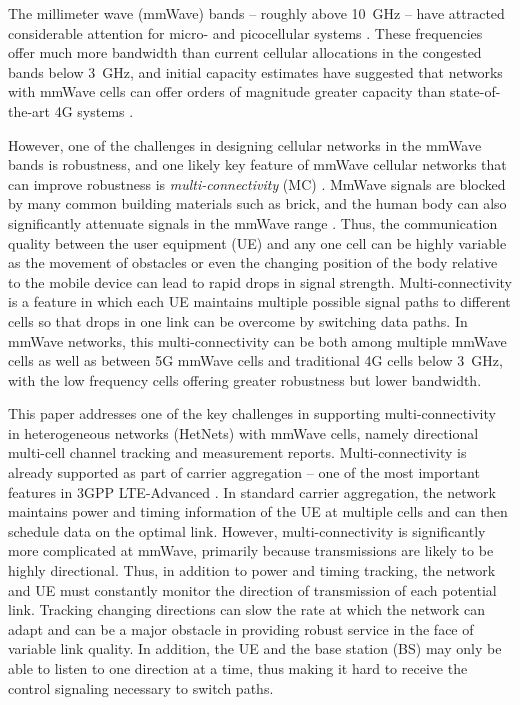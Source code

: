\documentclass[conference,a4paper]{IEEEtran}
\begin{document}
The millimeter wave (mmWave) bands -- roughly above 10~GHz --
have attracted considerable attention
for micro- and picocellular systems \cite{RanRapE:14}.
These frequencies offer much more
bandwidth than current cellular allocations in the congested bands below 3~GHz, and initial capacity estimates have suggested that networks with
mmWave cells can offer orders of magnitude greater capacity than state-of-the-art 4G systems \cite{Mustafa}.

However, one of the challenges in designing cellular networks in the mmWave bands is robustness,
and one likely key feature of mmWave cellular networks that can improve robustness is
\emph{ multi-connectivity} (MC) \cite{MC}.
MmWave signals are blocked by many common building materials such as brick, and  the human body can also
significantly attenuate signals in the mmWave range \cite{lu2012modeling}.  Thus, the communication quality
between the user equipment (UE)
and any one cell can be highly variable as the movement of obstacles or even the changing position of the
body relative to the mobile device can lead to rapid drops in signal strength.
Multi-connectivity is a feature in which each UE maintains multiple possible signal paths to different
cells so that drops in one link can be overcome by switching data paths.
In  mmWave networks, this multi-connectivity can be  both among multiple mmWave cells
as well as between 5G mmWave cells and traditional 4G cells below 3~GHz, with the low frequency cells offering greater
robustness but lower bandwidth.

This paper addresses one of the key challenges in supporting multi-connectivity in
heterogeneous networks (HetNets) with mmWave cells, namely directional multi-cell channel tracking
and measurement reports.
Multi-connectivity is already supported as part of carrier aggregation -- one of the most
important features in 3GPP LTE-Advanced \cite{CA_LTE}.  In standard carrier aggregation,
the network maintains power and timing information of the UE at multiple cells and can then
schedule data on the optimal link.
However, multi-connectivity is significantly more complicated at mmWave, primarily because
transmissions are likely to be highly directional. Thus,
in addition to power and timing tracking, the network and UE must constantly monitor the direction
of transmission of each potential link. Tracking changing directions can slow the rate at which
the network can adapt and can be a major obstacle in providing robust service in the face of variable link
quality.  In addition, the UE and the base station (BS)  may only be able to listen to one direction at a time,
thus making it hard to receive the control signaling necessary to switch paths.
\end{document}
